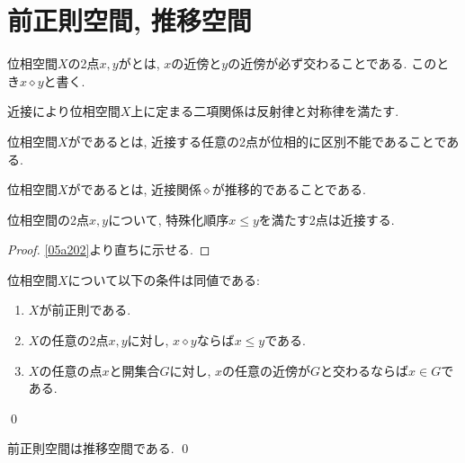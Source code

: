 \documentclass[uplatex, dvipdfmx, a4paper, 12pt, class=jsbook, crop=false]{standalone}
\begin{document}
\section{前正則空間, 推移空間}
\label{sec:preregular-spaces}

\newcommand{\topleq}{\leq}
\newcommand{\topnear}{\mathrel{\diamond}}

\begin{definition}
	位相空間\(X\)の2点\(x, y\)がとは,
	\(x\)の近傍と\(y\)の近傍が必ず交わることである.
	このとき\(x \topnear y\)と書く.
\end{definition}

近接により位相空間\(X\)上に定まる二項関係は反射律と対称律を満たす.

\begin{definition}
	位相空間\(X\)がであるとは,
	近接する任意の2点が位相的に区別不能であることである.
\end{definition}

\begin{definition}
	位相空間\(X\)がであるとは,
	近接関係\(\topnear\)が推移的であることである.
\end{definition}

\begin{proposition}
	位相空間の2点\(x, y\)について, 特殊化順序\(x \topleq y\)を満たす2点は近接する.
\end{proposition}

\begin{proof}
	\cref{05a202}より直ちに示せる.
\end{proof}

\begin{proposition}
	\label{ae23aa}
	位相空間\(X\)について以下の条件は同値である:
	\begin{enumerate}
		\item \(X\)が前正則である.
		\item \(X\)の任意の2点\(x, y\)に対し, \(x \topnear y\)ならば\(x \topleq y\)である.
		\item \(X\)の任意の点\(x\)と開集合\(G\)に対し, \(x\)の任意の近傍が\(G\)と交わるならば\(x \in G\)である.
	\end{enumerate}
	\qed
\end{proposition}

\begin{proposition}
	前正則空間は推移空間である.
	\qed
\end{proposition}
\end{document}
